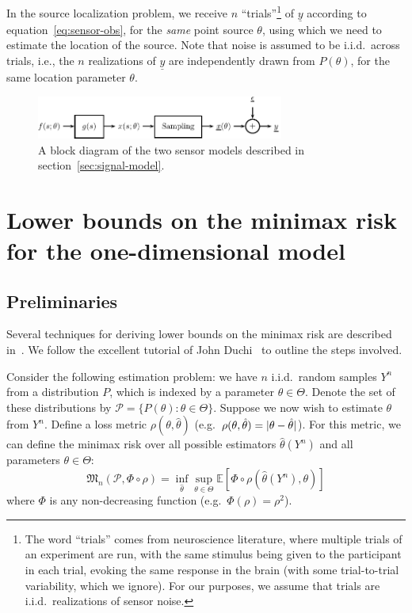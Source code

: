 \documentclass[conference]{IEEEtran}
\providecommand{\v}{}
\renewcommand{\v}[1]{\underline{#1}}
\DeclarePairedDelimiter\abs{\lvert}{\rvert}
\newcommand{\Phiorho}{\Phi\!\circ\!\rho}
\begin{document}
In the source localization problem, we receive $n$ ``trials''\footnote{The word
	``trials'' comes from neuroscience literature, where multiple trials of an
	experiment are run, with the same stimulus being given to the participant
	in each trial, evoking the same response in the brain (with some
trial-to-trial variability, which we ignore). For our purposes, we assume that
trials are i.i.d.\ realizations of sensor noise.} of $\v y$ according to
equation~\eqref{eq:sensor-obs}, for the \emph{same} point source $\theta$,
using which we need to estimate the location of the source. Note that noise is
assumed to be i.i.d.\ across trials, i.e., the $n$ realizations of $\v y$ are
independently drawn from $P(\theta)$, for the same location parameter $\theta$.

\begin{figure}[tp] %
	\centering
	\includegraphics[width=3.2in]{block-diagram}
	\caption{A block diagram of the two sensor models described in
	section~\ref{sec:signal-model}.}
	\label{fig:signal-model}
\end{figure}

\section{Lower bounds on the minimax risk for the one-dimensional model}
\label{sec:minimax-lower-bounds}

\subsection{Preliminaries}

Several techniques for deriving lower bounds on the minimax risk are described
in~\cite{Tsybakov2009Introduction}. We follow the excellent tutorial of John
Duchi~\cite{Duchi2015Information} to outline the steps involved.

Consider the following estimation problem: we have $n$ i.i.d.\ random samples
$Y^n$ from a distribution $P$, which is indexed by a parameter $\theta \in
\Theta$.  Denote the set of these distributions by $\mathcal{P} = \{P(\theta) :
\theta \in \Theta\}$. Suppose we now wish to estimate $\theta$ from $Y^n$.
Define a loss metric $\rho(\theta, \hat\theta)$ (e.g.\ $\rho(\theta,
\hat\theta) = \abs{\theta - \hat\theta}$). For this metric, we can define the
minimax risk over all possible estimators $\hat\theta(Y^n)$ and all parameters
$\theta \in \Theta$:
\begin{equation} \label{eq:minimax-expr}
	\mathfrak{M}_n(\mathcal{P}, \Phiorho) = \inf_{\hat\theta} \sup_{\theta \in \Theta} \mathbb E[\Phiorho (\hat\theta(Y^n), \theta)]
\end{equation}
where $\Phi$ is any non-decreasing function (e.g.\ $\Phi(\rho) = \rho^2$).
\end{document}
